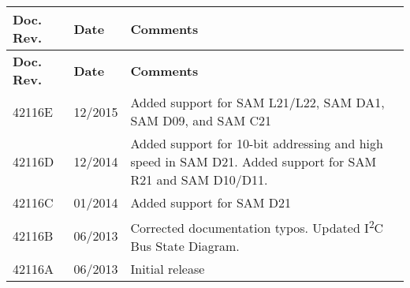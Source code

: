 \tabulinesep=1mm
\begin{longtabu}spread 0pt [c]{*{3}{|X[-1]}|}
\hline
\cellcolor{\tableheadbgcolor}\textbf{ Doc. Rev. }&\cellcolor{\tableheadbgcolor}\textbf{ Date }&\cellcolor{\tableheadbgcolor}\textbf{ Comments  }\\
\endfirsthead
\hline
\endfoot
\hline
\cellcolor{\tableheadbgcolor}\textbf{ Doc. Rev. }&\cellcolor{\tableheadbgcolor}\textbf{ Date }&\cellcolor{\tableheadbgcolor}\textbf{ Comments  }\\
\endhead
42116E &12/2015 &Added support for SAM L21/\+L22, SAM DA1, SAM D09, and SAM C21  \\
42116D &12/2014 &Added support for 10-\/bit addressing and high speed in SAM D21. Added support for SAM R21 and SAM D10/\+D11.  \\
42116C &01/2014 &Added support for SAM D21  \\
42116B &06/2013 &Corrected documentation typos. Updated I\textsuperscript{2}C Bus State Diagram.  \\
42116A &06/2013 &Initial release  \\
\end{longtabu}
